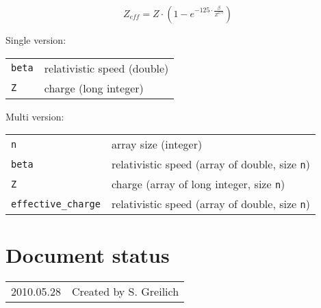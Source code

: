 \begin{equation}
Z_{eff}=Z\cdot(1-e^{-125\cdot\frac{\beta}{Z^{2/3}}})
\end{equation}

Single version:\\

\begin{tabular}{l l}
\texttt{beta} & relativistic speed (double) \\
\texttt{Z} & charge (long integer) \\
\end{tabular}

Multi version:\\

\begin{tabular}{l l}
\texttt{n} & array size (integer) \\
\texttt{beta} & relativistic speed (array of double, size \texttt{n}) \\
\texttt{Z} & charge (array of long integer, size \texttt{n}) \\
\texttt{effective\_charge} & relativistic speed (array of double, size \texttt{n}) \\
\end{tabular}


\section*{Document status}
\begin{tabular}{l l}
2010.05.28&Created by S. Greilich
\end{tabular}